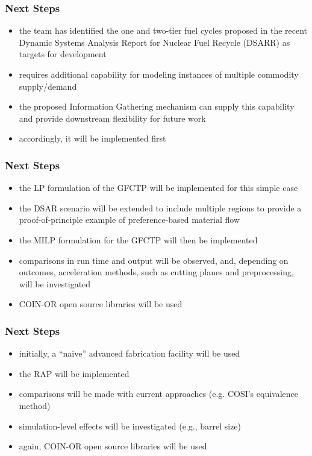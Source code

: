 \begin{frame}[ctb!]
  \frametitle{Next Steps} 
  
  \begin{itemize}
    \item the \Cyclus team has identified the one and two-tier fuel cycles
      proposed in the recent Dynamic Systems Analysis Report for Nuclear Fuel
      Recycle (DSARR) \cite{dixon_dynamic_2008} as targets for
      development
    \item \Cyclus requires additional capability for modeling instances of
      multiple commodity supply/demand
    \item the proposed Information Gathering mechanism can supply this capability
      and provide downstream flexibility for future work
    \item accordingly, it will be implemented first
  \end{itemize}
\end{frame}

\begin{frame}[ctb!]
  \frametitle{Next Steps} 

  \begin{itemize}
    \item the LP formulation of the GFCTP will be implemented for this simple
      case
    \item the DSAR scenario will be extended to include multiple regions to
      provide a proof-of-principle example of preference-based material flow
    \item the MILP formulation for the GFCTP will then be implemented
    \item comparisons in run time and output will be observed, and, depending on
      outcomes, acceleration methods, such as cutting planes and preprocessing,
      will be investigated
    \item COIN-OR\cite{lougee_common_2003} open source libraries will be used
  \end{itemize}
\end{frame}

\begin{frame}[ctb!]
  \frametitle{Next Steps} 
  
  \begin{itemize}
    \item initially, a ``naive'' advanced fabrication facility will be used
    \item the RAP will be implemented 
    \item comparisons will be made with current approaches (e.g. COSI's equivalence method)
    \item simulation-level effects will be investigated (e.g., barrel size)
    \item again, COIN-OR open source libraries will be used
  \end{itemize}
\end{frame}
